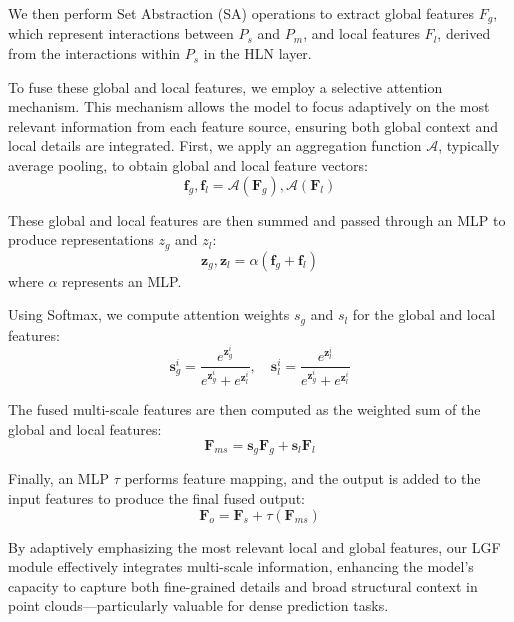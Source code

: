 We then perform Set Abstraction (SA) operations to extract global features $F_g$, which represent interactions between $P_s$ and $P_m$, and local features $F_l$, derived from the interactions within $P_s$ in the HLN layer.

To fuse these global and local features, we employ a selective attention mechanism. This mechanism allows the model to focus adaptively on the most relevant information from each feature source, ensuring both global context and local details are integrated. First, we apply an aggregation function $\mathcal{A}$, typically average pooling, to obtain global and local feature vectors:
\begin{equation}
	\boldsymbol{f}_g, \boldsymbol{f}_l = \mathcal{A}(\boldsymbol{F}_g),  \mathcal{A}(\boldsymbol{F}_l)
\end{equation}

These global and local features are then summed and passed through an MLP to produce representations $z_g$ and $z_l$:
\begin{equation}
	\boldsymbol{z}_g, \boldsymbol{z}_l = \alpha \left( \boldsymbol{f}_g + \boldsymbol{f}_l \right)
\end{equation}
where $\alpha$ represents an MLP.

Using Softmax, we compute attention weights $s_g$ and $s_l$ for the global and local features:
\begin{equation}
	\boldsymbol{s}_g^i = \frac{e^{\boldsymbol{z}_g^i}}{e^{\boldsymbol{z}_g^i} + e^{\boldsymbol{z}_l^i}}, \quad \boldsymbol{s}_l^i = \frac{e^{\boldsymbol{z}_l^i}}{e^{\boldsymbol{z}_g^i} + e^{\boldsymbol{z}_l^i}}
\end{equation}

The fused multi-scale features are then computed as the weighted sum of the global and local features:
\begin{equation}
	\boldsymbol{F}_{ms} = \boldsymbol{s}_g \boldsymbol{F}_g + \boldsymbol{s}_l \boldsymbol{F}_l
\end{equation}

Finally, an MLP $\tau$ performs feature mapping, and the output is added to the input features to produce the final fused output:
\begin{equation}
	\boldsymbol{F}_{o} = \boldsymbol{F}_s + \tau \left( \boldsymbol{F}_{ms} \right)
\end{equation}

By adaptively emphasizing the most relevant local and global features, our LGF module effectively integrates multi-scale information, enhancing the model's capacity to capture both fine-grained details and broad structural context in point clouds—particularly valuable for dense prediction tasks.

